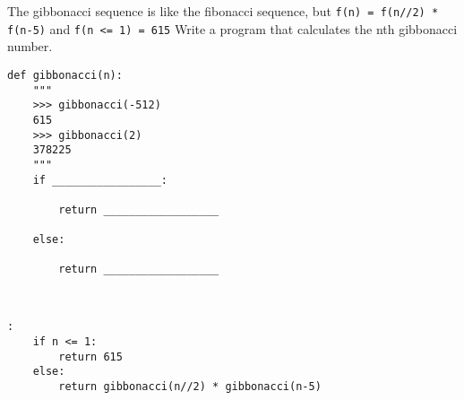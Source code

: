 \begin{blocksection}
\question The gibbonacci sequence is like the fibonacci sequence, but \texttt{f(n) = f(n//2) * f(n-5)} and
\texttt{f(n <= 1) = 615} Write a program that calculates the nth gibbonacci number.

\begin{lstlisting}
def gibbonacci(n):
    """
    >>> gibbonacci(-512)
    615
    >>> gibbonacci(2)
    378225
    """
    if _________________:
		
        return __________________
				
    else:
		
        return __________________

				
\end{lstlisting}

\begin{solution}[1in]
\begin{lstlisting}:
    if n <= 1:
        return 615
    else:
        return gibbonacci(n//2) * gibbonacci(n-5)
\end{lstlisting}
\end{solution}
\end{blocksection}
